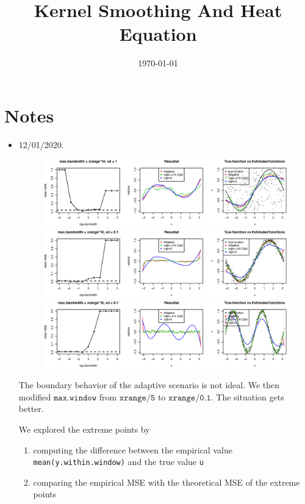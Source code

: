 \documentclass{article}
\title{Kernel Smoothing And Heat Equation}
\date{\today}
\begin{document}
\maketitle

\section{Notes}
\label{sec:notes}

\begin{itemize}
\item 12/01/2020. 
\begin{figure}[H]
\includegraphics[width=\linewidth]{pic/sim.plot1.eps}
\includegraphics[width=\linewidth]{pic/sim.plot2.eps}
\includegraphics[width=\linewidth]{pic/sim.plot3.eps}
\end{figure}

The boundary behavior of the adaptive scenario is not ideal. We then modified $\texttt{max.window}$ from $\texttt{xrange/5}$ to $\texttt{xrange/0.1}$. The situation gets better. 

We explored the extreme points by 
\begin{enumerate}
\item computing the difference between the empirical value \texttt{mean(y.within.window)} and the true value \texttt{u}
\item comparing the empirical MSE with the theoretical MSE of the extreme points
\end{enumerate}


\end{itemize}
\end{document}

